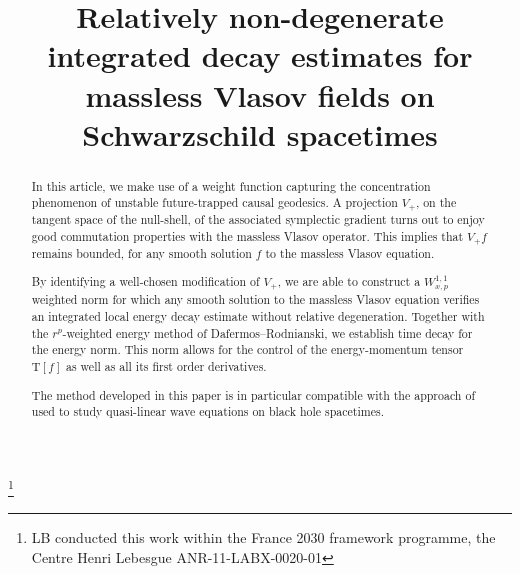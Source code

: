 \documentclass[JEP,XML,SOM,Unicode,published]{cedram}
\theoremstyle{plain}
\theoremstyle{definition}
\begin{document}
\frontmatter
\title[Relatively non-degenerate estimates for massless Vlasov on Schwarzschild]{Relatively non-degenerate integrated decay estimates for massless Vlasov fields on Schwarzschild spacetimes}

\author[\initial{L.} \lastname{Bigorgne}]{ }
\address{Univ Rennes, CNRS, IRMAR - UMR 6625\\
F-35000 Rennes, France}

\author[\initial{R.} \lastname{Velozo Ruiz}]{ }
\address{Department of Mathematics, University of Toronto,\\
40 St. George Street, Toronto, ON, Canada}

\thanks{LB conducted this work within the France 2030 framework programme, the Centre Henri Lebesgue ANR-11-LABX-0020-01}

\begin{abstract}
In this article, we make use of a weight function capturing the concentration phenomenon of unstable future-trapped causal geodesics. A projection $V_+$, on the tangent space of the null-shell, of the associated symplectic gradient turns out to enjoy good commutation properties with the massless Vlasov operator. This implies that $V_+f$ remains bounded, for any smooth solution $f$ to the massless Vlasov equation.

By identifying a well-chosen modification of $V_+$, we are able to construct a $W_{x,p}^{1,1}$ weighted norm for which any smooth solution to the massless Vlasov equation verifies an integrated local energy decay estimate without relative degeneration. Together with the $r^p$-weighted energy method of Dafermos--Rodnianski, we establish time decay for the energy norm. This norm allows for the control of the energy-momentum tensor $\mathrm{T}[f]$ as well as all its first order derivatives.

The method developed in this paper is in particular compatible with the approach of \cite{Mavq, DHRTq} used to study quasi-linear wave equations on black hole spacetimes. 
\end{abstract}


\end{document}
